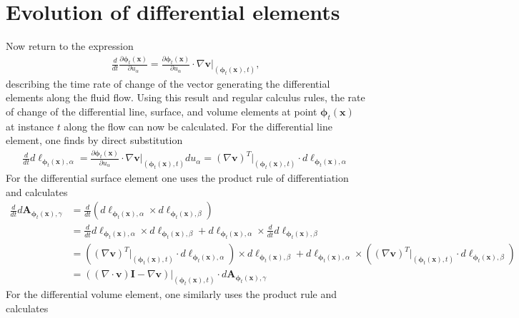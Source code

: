 \section{Evolution of differential elements}
Now return to the expression 
\begin{align}
    \frac{d}{dt}\frac{\partial\bm{\phi}_t(\bm{x})}{\partial u_\alpha}=\frac{\partial\bm{\phi}_t(\bm{x})}{\partial u_\alpha}\cdot\nabla\bm{v}\Big|_{(\bm{\phi}_t(\bm{x}),t)},
\end{align}
describing the time rate of change of the vector generating the differential elements along the fluid flow. Using this result and regular calculus rules, the rate of change of the differential line, surface, and volume elements at point $\bm{\phi}_t(\bm{x})$ at instance $t$ along the flow can now be calculated. For the differential line element, one finds by direct substitution
\begin{align}\label{eq:dl_dt}
    \frac{d}{dt}d\bm{\ell}_{\bm{\phi}_t(\bm{x}),\alpha}=\frac{\partial\bm{\phi}_t(\bm{x})}{\partial u_\alpha}\cdot\nabla\bm{v}\Big|_{(\bm{\phi}_t(\bm{x}),t)}du_\alpha=(\nabla \bm{v})^T\Big|_{(\bm{\phi}_t(\bm{x}),t)}\cdot d\bm{\ell}_{\bm{\phi}_t(\bm{x}),\alpha}
\end{align}
For the differential surface element one uses the product rule of differentiation and calculates
\begin{align}\label{eq:dA_dt}
    \frac{d}{dt}d\bm{A}_{\bm{\phi}_t(\bm{x}),\gamma}&=\frac{d}{dt}\left(d\bm{\ell}_{\bm{\phi}_t(\bm{x}),\alpha}\times d\bm{\ell}_{\bm{\phi}_t(\bm{x}),\beta}\right)\nonumber\\
    &=\frac{d}{dt}d\bm{\ell}_{\bm{\phi}_t(\bm{x}),\alpha}\times d\bm{\ell}_{\bm{\phi}_t(\bm{x}),\beta}+d\bm{\ell}_{\bm{\phi}_t(\bm{x}),\alpha}\times \frac{d}{dt}d\bm{\ell}_{\bm{\phi}_t(\bm{x}),\beta}\nonumber\\
    &=\left((\nabla \bm{v})^T\Big|_{(\bm{\phi}_t(\bm{x}),t)}\cdot d\bm{\ell}_{\bm{\phi}_t(\bm{x}),\alpha}\right)\times d\bm{\ell}_{\bm{\phi}_t(\bm{x}),\beta}+d\bm{\ell}_{\bm{\phi}_t(\bm{x}),\alpha}\times\left((\nabla \bm{v})^T\Big|_{(\bm{\phi}_t(\bm{x}),t)}\cdot d\bm{\ell}_{\bm{\phi}_t(\bm{x}),\beta}\right)\nonumber\\
    &=\left((\nabla\cdot\bm{v})\bm{I}-\nabla\bm{v}\right)\Big|_{(\bm{\phi}_t(\bm{x}),t)}\cdot d\bm{A}_{\bm{\phi}_t(\bm{x}),\gamma}
\end{align}
For the differential volume element, one similarly uses the product rule and calculates
